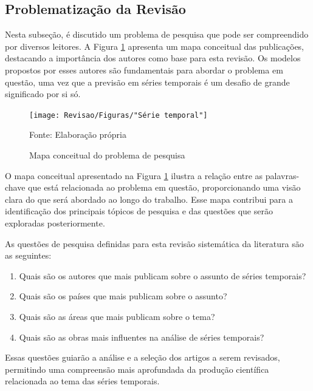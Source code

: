 \subsection{Problematiza\c c\~ao da Revis\~ao} \label{subsec: problematização da revisão}

Nesta subseção, é discutido um problema de pesquisa que pode ser compreendido por diversos leitores. A Figura \ref{fig:serie-temporal} apresenta um mapa conceitual das publicações, destacando a importância dos autores como base para esta revisão. Os modelos propostos por esses autores são fundamentais para abordar o problema em questão, uma vez que a previsão em séries temporais é um desafio de grande significado por si só.

\begin{figure}[H]
	\centering
	\caption{Mapa conceitual do problema de pesquisa}
	\label{fig:serie-temporal}
	\texttt{[image: Revisao/Figuras/"Série temporal"]}
	
	Fonte: Elaboração própria 
\end{figure}

O mapa conceitual apresentado na Figura \ref{fig:serie-temporal} ilustra a relação entre as palavras-chave que está relacionada ao problema em questão, proporcionando uma visão clara do que será abordado ao longo do trabalho. Esse mapa contribui para a identificação dos principais tópicos de pesquisa e das questões que serão exploradas posteriormente.

As questões de pesquisa definidas para esta revisão sistemática da literatura são as seguintes:

\begin{enumerate}[start=1, label = {\textbf{Q} \arabic*} ]
	\item \label{questão:rev1} Quais são os autores que mais publicam sobre o assunto de séries temporais?
	\item \label{questão:rev2} Quais são os países que mais publicam sobre o assunto? 
	\item \label{questão:rev3} Quais são as áreas que mais publicam sobre o tema?
	\item \label{questão:rev4} Quais são as obras mais influentes na análise de séries temporais?
\end{enumerate}

Essas questões guiarão a análise e a seleção dos artigos a serem revisados, permitindo uma compreensão mais aprofundada da produção científica relacionada ao tema das séries temporais.

